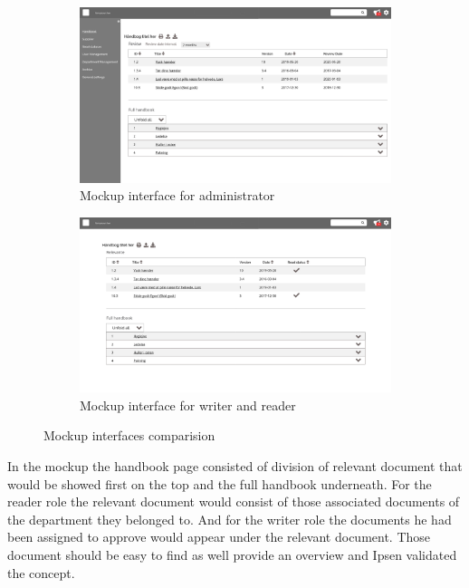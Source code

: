 \begin{figure}[H]
	\centering
	\begin{subfigure}[b]{0.48\textwidth}
		\includegraphics[width=\textwidth]{billeder/ForsideAdmin.jpg}
		\caption{Mockup interface for administrator}
	\end{subfigure}
	\quad
	\begin{subfigure}[b]{0.48\textwidth}
		\includegraphics[width=\textwidth]{billeder/ForsideWriterReader.jpg}
		\caption{Mockup interface for writer and reader}
	\end{subfigure}
	\caption{Mockup interfaces comparision}\label{fig:mockupSidebar}
\end{figure}

In the mockup the handbook page consisted of division of relevant document that would be showed first on the top and the full handbook underneath.
For the reader role the relevant document would consist of those associated documents of the department they belonged to. 
And for the writer role the documents he had been assigned to approve would appear under the relevant document. 
Those document should be easy to find as well provide an overview and Ipsen validated the concept.


